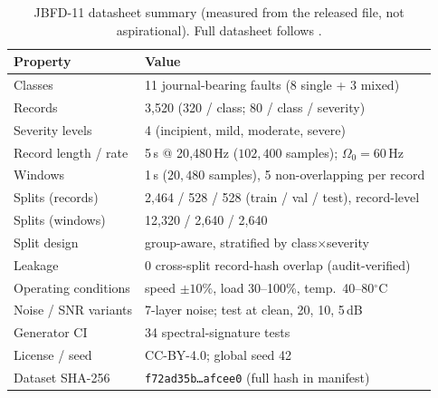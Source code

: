 \begin{table}[t]
  \centering
  \caption{JBFD-11 datasheet summary (measured from the released file, not
    aspirational). Full datasheet follows \citet{gebru2021datasheets}.}
  \label{tab:datasheet}
  \begin{tabular}{ll}
    \toprule
    Property & Value \\
    \midrule
    Classes & 11 journal-bearing faults (8 single + 3 mixed) \\
    Records & 3{,}520 (320 / class; 80 / class / severity) \\
    Severity levels & 4 (incipient, mild, moderate, severe) \\
    Record length / rate & 5\,s @ 20{,}480\,Hz ($102{,}400$ samples); $\Omega_0=60$\,Hz \\
    Windows & 1\,s ($20{,}480$ samples), 5 non-overlapping per record \\
    Splits (records) & 2{,}464 / 528 / 528 (train / val / test), record-level \\
    Splits (windows) & 12{,}320 / 2{,}640 / 2{,}640 \\
    Split design & group-aware, stratified by class$\times$severity \\
    Leakage & 0 cross-split record-hash overlap (audit-verified) \\
    Operating conditions & speed $\pm10\%$, load 30--100\%, temp.\ 40--80$^\circ$C \\
    Noise / SNR variants & 7-layer noise; test at clean, 20, 10, 5\,dB \\
    Generator CI & 34 spectral-signature tests \\
    License / seed & CC-BY-4.0; global seed 42 \\
    Dataset SHA-256 & \texttt{f72ad35b\ldots afcee0} (full hash in manifest) \\
    \bottomrule
  \end{tabular}
\end{table}
